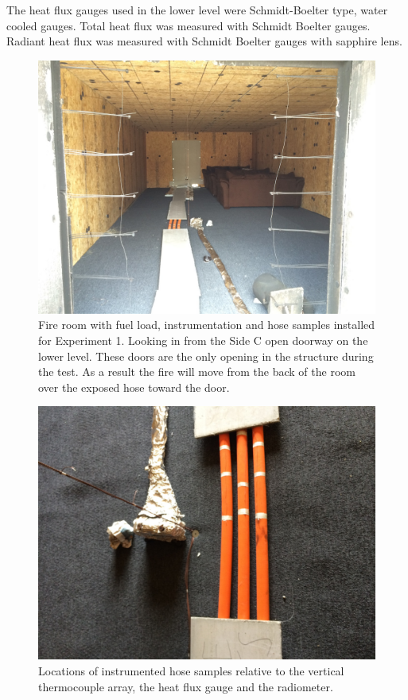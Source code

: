 \documentclass[letterpaper,11pt]{texMemo} %
\begin{document}
The heat flux gauges used in the lower level were Schmidt-Boelter type, water cooled gauges.  Total heat flux was measured with Schmidt Boelter gauges. Radiant heat flux was measured with Schmidt Boelter gauges with sapphire lens.  

\begin{figure}[!ht]
\centering
\includegraphics[width=0.8\columnwidth]{../Figures/Hose_Figures/test_setup_1}
\caption{Fire room with fuel load, instrumentation and hose samples installed for Experiment 1. Looking in from the Side C open doorway on the lower level. These doors are the only opening in the structure during the test. As a result the fire will move from the back of the room over the exposed hose toward the door.}
\label{fig:test_setup_1}
\end{figure}

\begin{figure}[!ht]
\centering
\includegraphics[width=0.8\columnwidth]{../Figures/Hose_Figures/test_setup_1b}
\caption{Locations of instrumented hose samples relative to the vertical thermocouple array, the heat flux gauge and the radiometer.}
\label{fig:test_setup_1b}
\end{figure}
\end{document}
